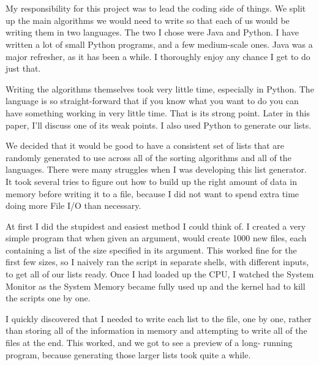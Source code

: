 \documentclass[12pt]{amsart}
\title{}
\author{}
\date{} %
\begin{document}
\maketitle
\tableofcontents

\section{}
\subsection{}

My responsibility for this project was to lead the coding side of things. We
split up the main algorithms we would need to write so that each of us would be
writing them in two languages. The two I chose were Java and Python. I have
written a lot of small Python programs, and a few medium-scale ones. Java was a
major refresher, as it has been a while. I thoroughly enjoy any chance I get to
do just that. 

Writing the algorithms themselves took very little time, especially in Python. 
The language is so straight-forward that if you know what you want to do you 
can have something working in very little time. That is its strong point. Later 
in this paper, I'll discuss one of its weak points. I also used Python to 
generate our lists. 

We decided that it would be good to have a consistent set of lists that are 
randomly generated to use across all of the sorting algorithms and all of the 
languages. There were many struggles when I was developing this list generator. 
It took several tries to figure out how to build up the right amount of data in 
memory before writing it to a file, because I did not want to spend extra time 
doing more File I/O than necessary. 

At first I did the stupidest and easiest method I could think of. I created a 
very simple program that when given an argument, would create 1000 new files, 
each containing a list of the size specified in its argument. This worked fine 
for the first few sizes, so I naively ran the script in separate shells, with 
different inputs, to get all of our lists ready. Once I had loaded up the CPU, I 
watched the System Monitor as the System Memory became fully used up and the 
kernel had to kill the scripts one by one.

I quickly discovered that I needed to write each list to the file, one by one,
rather than storing all of the information in memory and attempting to write all
of the files at the end. This worked, and we got to see a preview of a long-
running program, because generating those larger lists took quite a while.
\end{document}
